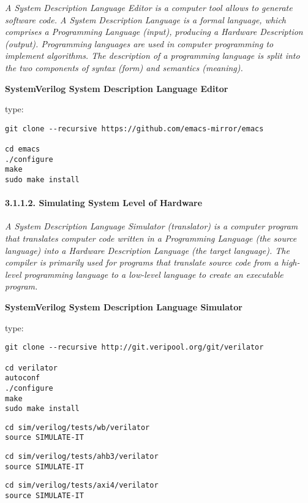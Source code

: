\documentclass[]{article}
\let\oldparagraph\paragraph
\renewcommand{\paragraph}[1]{\oldparagraph{#1}\mbox{}}
\begin{document}
\emph{A System Description Language Editor is a computer tool allows to
generate software code. A System Description Language is a formal
language, which comprises a Programming Language (input), producing a
Hardware Description (output). Programming languages are used in
computer programming to implement algorithms. The description of a
programming language is split into the two components of syntax (form)
and semantics (meaning).}

\textbf{SystemVerilog System Description Language Editor}

type:

\begin{verbatim}
git clone --recursive https://github.com/emacs-mirror/emacs

cd emacs
./configure
make
sudo make install
\end{verbatim}

\paragraph{3.1.1.2. Simulating System Level of
Hardware}\label{simulating-system-level-of-hardware}

\emph{A System Description Language Simulator (translator) is a computer
program that translates computer code written in a Programming Language
(the source language) into a Hardware Description Language (the target
language). The compiler is primarily used for programs that translate
source code from a high-level programming language to a low-level
language to create an executable program.}

\textbf{SystemVerilog System Description Language Simulator}

type:

\begin{verbatim}
git clone --recursive http://git.veripool.org/git/verilator

cd verilator
autoconf
./configure
make
sudo make install
\end{verbatim}

\begin{verbatim}
cd sim/verilog/tests/wb/verilator
source SIMULATE-IT
\end{verbatim}

\begin{verbatim}
cd sim/verilog/tests/ahb3/verilator
source SIMULATE-IT
\end{verbatim}

\begin{verbatim}
cd sim/verilog/tests/axi4/verilator
source SIMULATE-IT
\end{verbatim}
\end{document}
